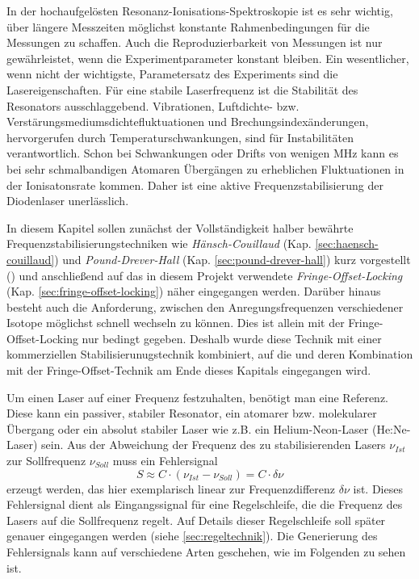 In der hochaufgelösten Resonanz-Ionisations-Spektroskopie ist es
sehr wichtig, über längere Messzeiten möglichst konstante Rahmenbedingungen für
die Messungen zu schaffen. Auch die Reproduzierbarkeit von Messungen ist nur
gewährleistet, wenn die Experimentparameter konstant bleiben. Ein wesentlicher, wenn nicht der
wichtigste, Parametersatz des Experiments sind die Lasereigenschaften. Für
eine stabile Laserfrequenz ist die Stabilität des Resonators ausschlaggebend.
Vibrationen, Luftdichte- bzw. Verstärungsmediumsdichtefluktuationen und
Brechungsindexänderungen, hervorgerufen durch Temperaturschwankungen, sind für
Instabilitäten verantwortlich. Schon bei Schwankungen oder Drifts von wenigen
MHz kann es bei sehr schmalbandigen Atomaren Übergängen zu erheblichen
Fluktuationen in der Ionisatonsrate kommen. Daher ist eine aktive
Frequenzstabilisierung der Diodenlaser unerlässlich.\par
In diesem Kapitel sollen zunächst der Vollständigkeit halber bewährte
Frequenzstabilisierungstechniken wie
\textit{Hänsch-Couillaud} (Kap.
\ref{sec:haensch-couillaud}) und \textit{Pound-Drever-Hall} (Kap.
\ref{sec:pound-drever-hall}) kurz vorgestellt
(\cite{noertershaeuser:physik_des_lasers}) und anschließend auf das
in diesem Projekt verwendete \textit{Fringe-Offset-Locking} (Kap.
\ref{sec:fringe-offset-locking}) näher eingegangen werden. Darüber hinaus
besteht auch die Anforderung, zwischen den Anregungsfrequenzen verschiedener
Isotope möglichst schnell wechseln zu können. Dies ist allein mit der
Fringe-Offset-Locking nur bedingt gegeben. Deshalb wurde diese Technik mit einer
kommerziellen Stabilisierunugstechnik kombiniert, auf die und deren Kombination
mit der Fringe-Offset-Technik am Ende dieses Kapitals eingegangen wird.\par
Um einen Laser auf einer Frequenz festzuhalten, benötigt
man eine Referenz. Diese kann ein passiver, stabiler Resonator, ein atomarer
bzw. molekularer Übergang oder ein absolut stabiler Laser wie z.B. ein
Helium-Neon-Laser (He:Ne-Laser) sein.
Aus der Abweichung der Frequenz des zu stabilisierenden Lasers $\nu_{Ist}$ zur
Sollfrequenz $\nu_{Soll}$ muss ein Fehlersignal
\begin{equation}\label{eq:servoschleife_fehlersignal}
	S\approx C\cdot(\nu_{Ist}-\nu_{Soll})=C\cdot\delta\nu
\end{equation}
erzeugt werden, das hier exemplarisch linear zur Frequenzdifferenz $\delta\nu$
ist. Dieses Fehlersignal dient als Eingangssignal für eine Regelschleife, die
die Frequenz des Lasers auf die Sollfrequenz regelt. Auf Details dieser
Regelschleife soll später genauer eingegangen werden (siehe
\ref{sec:regeltechnik}). Die Generierung des Fehlersignals kann auf verschiedene Arten geschehen, wie im Folgenden zu sehen
ist.

